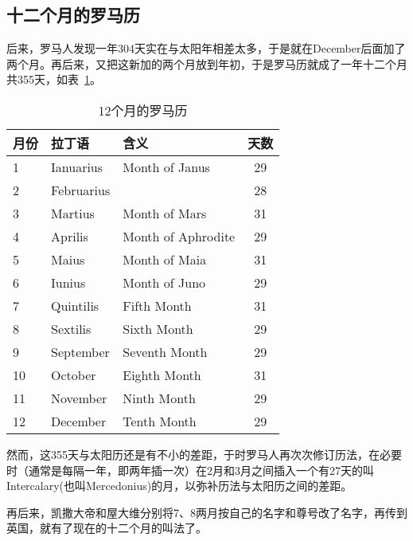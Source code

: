 \subsection{十二个月的罗马历}
\label{sec:12-months-roman-calendar}
后来，罗马人发现一年304天实在与太阳年相差太多，于是就在December后面加了两个月。再后来，又把这新加的两个月放到年初，于是罗马历就成了一年十二个月共355天，如表~\ref{tab:12-months-of-roman-calendar}。
\begin{table}[htbp]
  \centering
  \caption{12个月的罗马历}
  \label{tab:12-months-of-roman-calendar}
  \begin{minipage}{\textwidth}  %
  \centering
  \begin{tabular}{lllc}
    \toprule
    月份  & 拉丁语    & 含义              & 天数 \\\midrule
    1     & Ianuarius & Month of Janus    & 29   \\
    2     & Februarius&                   & 28   \\
    3     & Martius   & Month of Mars     & 31   \\
    4     & Aprilis   & Month of Aphrodite& 29   \\
    5     & Maius     & Month of Maia     & 31   \\
    6     & Iunius    & Month of Juno     & 29   \\
    7     & Quintilis & Fifth Month       & 31   \\
    8     & Sextilis  & Sixth Month       & 29   \\
    9     & September & Seventh Month     & 29   \\
    10    & October   & Eighth Month      & 31   \\
    11    & November  & Ninth Month       & 29   \\
    12    & December  & Tenth Month       & 29   \\
    \bottomrule
  \end{tabular}
  \end{minipage}
\end{table}

然而，这355天与太阳历还是有不小的差距，于时罗马人再次次修订历法，在必要时（通常是每隔一年，即两年插一次）在2月和3月之间插入一个有27天的叫Intercalary(也叫Mercedonius)的月，以弥补历法与太阳历之间的差距。

再后来，凯撒大帝和屋大维分别将7、8两月按自己的名字和尊号改了名字，再传到英国，就有了现在的十二个月的叫法了。

